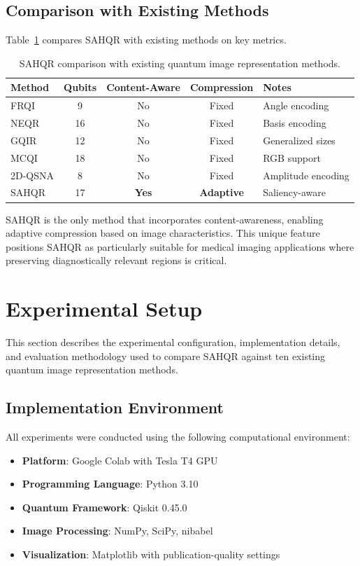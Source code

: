 \documentclass{ipol}
\begin{document}
\subsection{Comparison with Existing Methods}

Table~\ref{tab:sahqr_comparison} compares SAHQR with existing methods on key metrics.

\begin{table}[!htbp]
\caption{SAHQR comparison with existing quantum image representation methods.}
\label{tab:sahqr_comparison}
\centering
\begin{tabular}{@{}lcccl@{}}
\toprule
Method & Qubits & Content-Aware & Compression & Notes \\
\midrule
FRQI & 9 & No & Fixed & Angle encoding \\
NEQR & 16 & No & Fixed & Basis encoding \\
GQIR & 12 & No & Fixed & Generalized sizes \\
MCQI & 18 & No & Fixed & RGB support \\
2D-QSNA & 8 & No & Fixed & Amplitude encoding \\
SAHQR & 17 & \textbf{Yes} & \textbf{Adaptive} & Saliency-aware \\
\bottomrule
\end{tabular}
\end{table}

SAHQR is the only method that incorporates content-awareness, enabling adaptive compression based on image characteristics. This unique feature positions SAHQR as particularly suitable for medical imaging applications where preserving diagnostically relevant regions is critical.

\section{Experimental Setup}\label{sec:experiments}

This section describes the experimental configuration, implementation details, and evaluation methodology used to compare SAHQR against ten existing quantum image representation methods.

\subsection{Implementation Environment}

All experiments were conducted using the following computational environment:

\begin{itemize}
\item \textbf{Platform}: Google Colab with Tesla T4 GPU
\item \textbf{Programming Language}: Python 3.10
\item \textbf{Quantum Framework}: Qiskit 0.45.0 \cite{bib70}
\item \textbf{Image Processing}: NumPy, SciPy, nibabel
\item \textbf{Visualization}: Matplotlib with publication-quality settings \cite{bib71}
\end{itemize}
\end{document}
